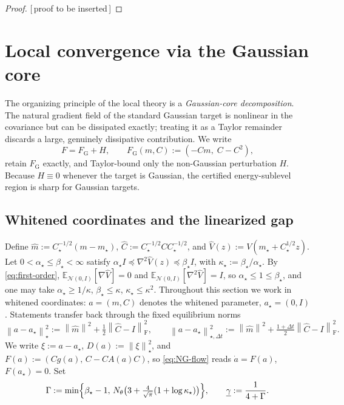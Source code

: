 \documentclass[11pt]{article}
\theoremstyle{plain}
\theoremstyle{definition}
\theoremstyle{remark}
\newcommand{\N}{\mathcal{N}}
\newcommand{\E}{\mathbb{E}}
\newcommand{\Id}{I}
\newcommand{\Frob}{\mathrm{F}}
\newcommand{\norm}[1]{\left\lVert #1\right\rVert}
\newcommand{\FGauss}{F_{\mathrm G}}
\newcommand{\gund}{\underline{\gamma}}
\newcommand{\PROOFHOLE}{{\color{red}\textsf{[\,proof to be inserted\,]}}}
\begin{document}
\begin{proof}
\PROOFHOLE
\end{proof}

\section{Local convergence via the Gaussian core}
\label{sec:local}

The organizing principle of the local theory is a \emph{Gaussian-core decomposition}. The natural
gradient field of the standard Gaussian target is nonlinear in the covariance but can be dissipated
exactly; treating it as a Taylor remainder discards a large, genuinely dissipative contribution. We
write
\[
    F=\FGauss+H,
    \qquad
    \FGauss(m,C):=(-Cm,\;C-C^2),
\]
retain $\FGauss$ exactly, and Taylor-bound only the non-Gaussian perturbation $H$. Because
$H\equiv0$ whenever the target is Gaussian, the certified energy-sublevel region is sharp for
Gaussian targets.

\subsection{Whitened coordinates and the linearized gap}
\label{subsec:whitened}

Define $\widehat m:=C_\star^{-1/2}(m-m_\star)$, $\widehat C:=C_\star^{-1/2}CC_\star^{-1/2}$, and
$\widehat V(z):=V(m_\star+C_\star^{1/2}z)$. Let $0<\alpha_\star\leq\beta_\star<\infty$ satisfy
$\alpha_\star\Id\preceq\nabla^2\widehat V(z)\preceq\beta_\star\Id$, with
$\kappa_\star:=\beta_\star/\alpha_\star$. By \eqref{eq:first-order},
$\E_{\N(0,\Id)}[\nabla\widehat V]=0$ and $\E_{\N(0,\Id)}[\nabla^2\widehat V]=\Id$, so
$\alpha_\star\leq1\leq\beta_\star$, and one may take $\alpha_\star\geq1/\kappa$,
$\beta_\star\leq\kappa$, $\kappa_\star\leq\kappa^2$. Throughout this section we work in whitened
coordinates: $a=(m,C)$ denotes the whitened parameter, $a_\star=(0,\Id)$. Statements transfer back
through the fixed equilibrium norms
\begin{equation}
\label{eq:local-norms}
    \norm{a-a_\star}_\star^2:=\norm{\widehat m}^2+\tfrac12\norm{\widehat C-\Id}_{\Frob}^2,
    \qquad
    \norm{a-a_\star}_{\star,\Delta t}^2:=\norm{\widehat m}^2+\tfrac{1+\Delta t}2\norm{\widehat C-\Id}_{\Frob}^2 .
\end{equation}
We write $\xi:=a-a_\star$, $D(a):=\norm{\xi}_\star^2$, and $F(a):=(Cg(a),\,C-CA(a)C)$, so
\eqref{eq:NG-flow} reads $\dot a=F(a)$, $F(a_\star)=0$. Set
\begin{equation}
\label{eq:Gamma}
    \Gamma:=\min\Bigl\{\beta_\star-1,\,N_\theta\bigl(3+\tfrac4{\sqrt\pi}(1+\log\kappa_\star)\bigr)\Bigr\},
    \qquad
    \gund:=\frac1{4+\Gamma} .
\end{equation}
\end{document}
